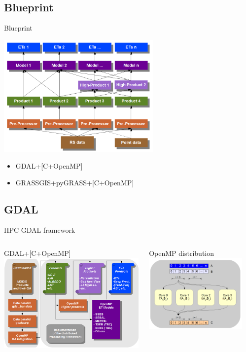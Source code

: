 \documentclass[xcolor=dvipsnames,beamer]{beamer} %
\begin{document}
\subsection{Blueprint}
\begin{frame}[fragile]{Blueprint}

\begin{center}
 \includegraphics[width=8cm]{chain0}
\end{center}

\begin{itemize}
 \item GDAL+[C+OpenMP]
 \item GRASSGIS+pyGRASS+[C+OpenMP]
\end{itemize}

\end{frame}

\subsection{GDAL}
\begin{frame}[fragile]{HPC GDAL framework}

\begin{columns}[l]
\begin{center}
 GDAL+[C+OpenMP]
 \includegraphics[width=7.5cm]{chain2}
\end{center}
\begin{center}
 OpenMP distribution
 \includegraphics[width=5cm]{chain1}
\end{center}
\end{columns}
\end{frame}
\end{document}

